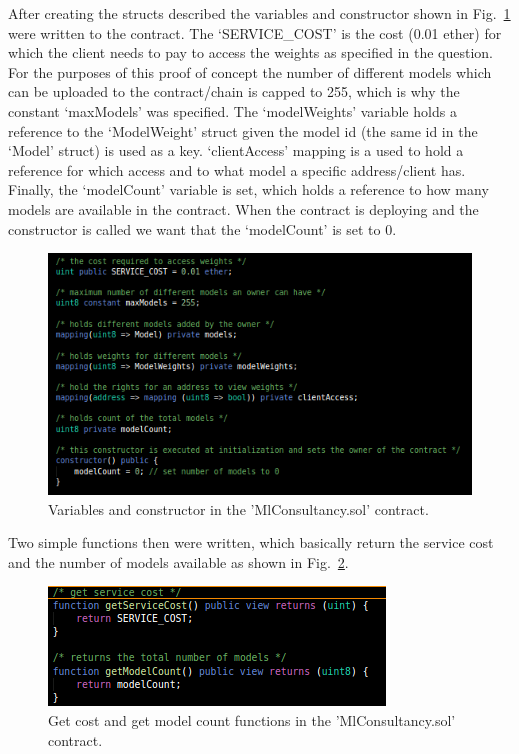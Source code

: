 \noindent
After creating the structs described the variables and constructor shown in Fig.~\ref{fig:model_sol_2} were written to the contract. The ‘SERVICE\_COST’ is the cost (0.01 ether) for which the client needs to pay to access the weights as specified in the question. For the purposes of this proof of concept the number of different models which can be uploaded to the contract/chain is capped to 255, which is why the constant ‘maxModels’ was specified. The ‘modelWeights’ variable holds a reference to the ‘ModelWeight’ struct given the model id (the same id in the ‘Model’ struct) is used as a key. ‘clientAccess’ mapping is a used to hold a reference for which access and to what model a specific address/client has. Finally, the ‘modelCount’ variable is set, which holds a reference to how many models are available in the contract. When the contract is deploying and the constructor is called we want that the ‘modelCount’ is set to 0.

\begin{figure}[H]
\centering
  \includegraphics[scale = .75]{imgs/model_sol_2.png}
  \caption{Variables and constructor in the 'MlConsultancy.sol' contract.}
  \label{fig:model_sol_2}
\end{figure}

\noindent
Two simple functions then were written, which basically return the service cost and the number of models available as shown in Fig.~\ref{fig:model_sol_3}. 

\begin{figure}[H]
\centering
  \includegraphics[scale = .75]{imgs/model_sol_3.png}
  \caption{Get cost and get model count functions in the 'MlConsultancy.sol' contract.}
  \label{fig:model_sol_3}
\end{figure}

